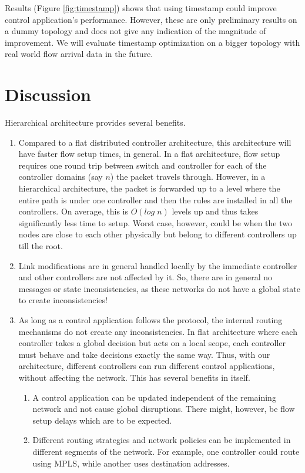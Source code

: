 \documentclass[10pt, twocolumn]{article}
\begin{document}
Results (Figure \ref{fig:timestamp}) shows that using timestamp could improve control application's performance. However, these are only preliminary results on a dummy topology and does not give any indication of the magnitude of improvement. We will evaluate timestamp optimization on a bigger topology with real world flow arrival data in the future. 

\section{Discussion}
\label{sec:discuss}
Hierarchical architecture provides several benefits.
\begin{enumerate}
    \item Compared to a flat distributed controller architecture, this architecture will have faster flow setup times, in general. In a flat architecture, flow setup requires one round trip between switch and controller for each of the controller domains (say $n$) the packet travels through. However, in a hierarchical architecture, the packet is forwarded up to a level where the entire path is under one controller and then the rules are installed in all the controllers. On average, this is $O(log\;n)$ levels up and thus takes significantly less time to setup. Worst case, however, could be when the two nodes are close to each other physically but belong to different controllers up till the root.
    \item Link modifications are in general handled locally by the immediate controller and other controllers are not affected by it. So, there are in general no messages or state inconsistencies, as these networks do not have a global state to create inconsistencies!
    \item As long as a control application follows the protocol, the internal routing mechanisms do not create any inconsistencies. In flat architecture where each controller takes a global decision but acts on a local scope, each controller must behave and take decisions exactly the same way. Thus, with our architecture, different controllers can run different control applications, without affecting the network. This has several benefits in itself.
        \begin{enumerate}
            \item A control application can be updated independent of the remaining network and not cause global disruptions. There might, however, be flow setup delays which are to be expected.
            \item Different routing strategies and network policies can be implemented in different segments of the network. For example, one controller could route using MPLS, while another uses destination addresses.

\end{enumerate}
\end{enumerate}
\end{document}
